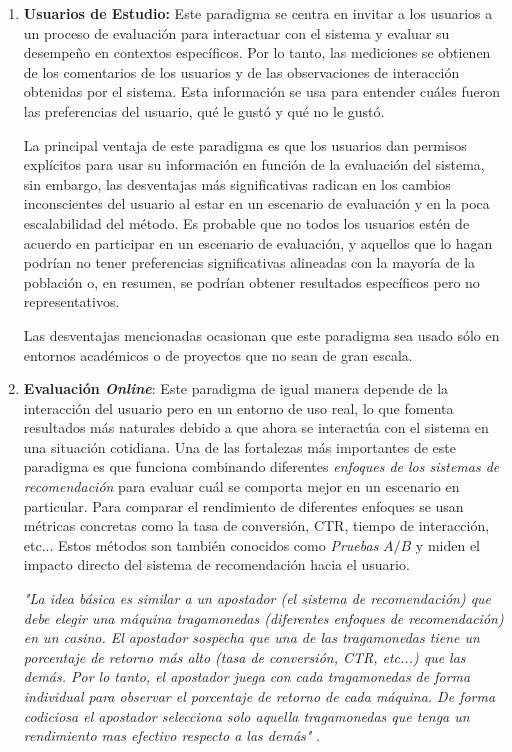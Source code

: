 \begin{enumerate}

    \item \textbf{Usuarios de Estudio: } Este paradigma se centra en invitar a los usuarios a un proceso de evaluación para interactuar con el sistema y evaluar su desempeño en contextos específicos. Por lo tanto, las mediciones se obtienen de los comentarios de los usuarios y de las observaciones de interacción obtenidas  por el sistema. 
    Esta información se usa para entender cuáles fueron las preferencias del usuario, qué le gustó y qué no le gustó.

    La principal ventaja de este paradigma es que los usuarios dan permisos explícitos para usar su información en función de la evaluación del sistema, sin embargo, las desventajas más significativas radican en los cambios inconscientes del usuario al estar en un escenario de evaluación y en la poca escalabilidad del método. 
    Es probable que no todos los usuarios estén de acuerdo en participar en un escenario de evaluación, y aquellos que lo hagan podrían no tener preferencias significativas alineadas con la mayoría de la población o, en resumen, se podrían obtener resultados específicos pero no representativos.

    Las desventajas mencionadas ocasionan que este paradigma sea usado sólo en entornos académicos o de proyectos que no sean de gran escala.
    
    \item{\textbf{Evaluación \textit{Online}}}: Este paradigma de igual manera depende de la interacción del usuario pero en un entorno de uso real, lo que fomenta resultados más naturales debido a que ahora se interactúa con el sistema en una situación cotidiana. Una de las fortalezas más importantes de este paradigma es que funciona combinando diferentes \textit{enfoques de los sistemas de recomendación} para evaluar cuál se comporta mejor en un escenario en particular. 
    Para comparar el rendimiento de diferentes enfoques se usan métricas concretas como la tasa de conversión, CTR, tiempo de interacción, etc... Estos métodos son también conocidos como \textit{Pruebas} $A / B$ y miden el impacto directo del sistema de recomendación hacia el usuario. 
 
    \textit{"La idea básica es similar a un apostador (el sistema de recomendación) que debe elegir una máquina tragamonedas (diferentes enfoques de recomendación) en un casino. El apostador sospecha que una de las tragamonedas tiene un porcentaje de retorno más alto (tasa de conversión, CTR, etc...) que las demás. Por lo tanto,  el apostador juega con cada tragamonedas de forma individual para observar el porcentaje de retorno de cada máquina. De forma codiciosa el apostador selecciona solo aquella tragamonedas que tenga un rendimiento mas efectivo respecto a las demás"} \parencite{Aggarwal2016}.


\end{enumerate}
